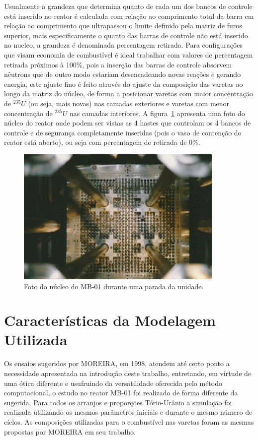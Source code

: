 \documentclass[
	12pt,				%
	openany,			%
	twoside,			%
	a4paper,			%
	english,			%
	french,				%
	spanish,			%
	brazil				%
	]{abntex2}
\begin{document}
Usualmente a grandeza que determina quanto de cada um dos bancos de controle está inserido no reator é calculada com relação ao comprimento total da barra em relação ao comprimento que ultrapassou o limite definido pela matriz de furos superior, mais especificamente o quanto das barras de controle não está inserido no nucleo, a grandeza é denominada percentagem retirada. Para configurações que visam economia de combustível é ideal trabalhar com valores de percentagem retirada próximos à 100\%, pois a inserção das barras de controle absorvem nêutrons que de outro modo estariam desencadeando novas reações e gerando energia, este
ajuste fino é feito através do ajuste da composição das varetas ao longo da matriz do núcleo, de forma a posicionar varetas com maior concentração de $^{235}U$ (ou seja, mais novas) nas camadas exteriores e varetas com menor concentração de $^{235}U$ nas camadas interiores. A figura~\ref{fotocore} apresenta uma foto do núcleo do reator onde podem ser vistas as 4 hastes que controlam os 4 bancos de controle e de segurança completamente inseridas (pois o vaso de contenção do reator está aberto), ou seja com percentagem de retirada de 0\%.

\begin{figure}[htpb]
	\caption{\label{fotocore} Foto do núcleo do MB-01 durante uma parada da unidade.}
	\begin{center}
	    \includegraphics[scale=1]{figs/FOTO_NUCLEO}
	\end{center}
\end{figure}

\part*{Características da Modelagem Utilizada}

Os ensaios sugeridos por MOREIRA, em 1998, atendem até certo ponto a necessidade apresentada na introdução deste trabalho, entretando, em virtude de uma ótica diferente e usufruindo da versatilidade oferecida pelo método computacional, o estudo no reator MB-01 foi realizado de forma diferente da sugerida. Para todos os arranjos e proporções Tório-Urânio a simulação foi realizada utilizando os mesmos parâmetros iniciais e durante o mesmo número de cíclos. As composições utilizadas 
para o combustível nas varetas foram as mesmas propostas por MOREIRA em seu trabalho.
\end{document}
